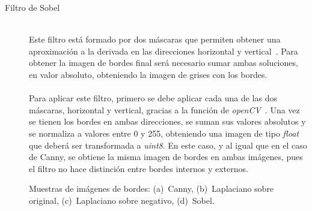 \begin{description}
	\vspace{10pt}
	\item[Filtro de Sobel] \hfill 
	\vspace{5pt}
	\\
	Este filtro está formado por dos máscaras que permiten obtener una aproximación a la derivada en las direcciones horizontal y vertical~\cite{gonzalez2008digital}. Para obtener la imagen de bordes final será necesario sumar ambas soluciones, en valor absoluto, obteniendo la imagen de grises con los bordes.\\
	\vspace{-10pt}
	\\
	Para aplicar este filtro, primero se debe aplicar cada una de las dos máscaras, horizontal y vertical, gracias a la función de \textit{openCV}~\cite{sobelOCV}. Una vez se tienen los bordes en ambas direcciones, se suman sus valores absolutos y se normaliza a valores entre 0 y 255, obteniendo una imagen de tipo \textit{float} que deberá ser transformada a \textit{uint8}. En este caso, y al igual que en el caso de Canny, se obtiene la misma imagen de bordes en ambas imágenes, pues el filtro no hace distinción entre bordes internos y externos.	
\end{description}

\begin{figure}[H]
	\centering
	 \hspace{10pt}
	 \hspace{10pt}
	 \hspace{10pt}
	\caption{Muestras de imágenes de bordes: (a)~Canny, (b)~Laplaciano sobre original, (c)~Laplaciano sobre negativo, (d)~Sobel.}
	\label{fig.bordes}
\end{figure}
\vspace{20pt}

